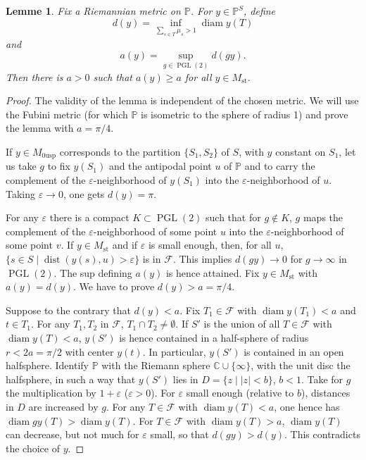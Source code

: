 \documentclass[12pt,a4paper]{article}
\theoremstyle{plain}
\newtheorem{lemma}[theorem]{Lemme}
\theoremstyle{definition}
\theoremstyle{remark}
\DeclareMathOperator{\diam}{diam}
\DeclareMathOperator{\PGL}{PGL}
\newcommand{\CC}{\mathbb{C}}
\newcommand{\PP}{\mathbb{P}}
\numberwithin{equation}{section}
\providecommand{\CC}{\mathbb{C}}
\providecommand{\PP}{\mathbb{P}}
\providecommand{\PGL}{\operatorname{PGL}}
\providecommand{\na}{a}
\providecommand{\dist}{\operatorname{dist}}
\begin{document}
\begin{lemma}\label{lem:4.4.1}
Fix a Riemannian metric on $\PP$. For $y \in \PP^S$, define
\[
d(y) = \inf_{\sum_{s \in T} \mu_s > 1} \diam y(T)
\]
and
\[
a(y) = \sup_{g \in \PGL(2)} d(gy).
\]
Then there is $a > 0$ such that $\na(y) \geq a$ for all $y \in M_{\mathrm{st}}$.
\end{lemma}

\begin{proof}
The validity of the lemma is independent of the chosen metric. We will use the Fubini metric (for which $\PP$ is isometric to the sphere of radius 1) and prove the lemma with $a = \pi/4$.

If $y \in M_{0\mathrm{usp}}$ corresponds to the partition $\{S_1, S_2\}$ of $S$, with $y$ constant on $S_1$, let us take $g$ to fix $y(S_1)$ and the antipodal point $u$ of $\PP$ and to carry the complement of the $\varepsilon$-neighborhood of $y(S_1)$ into the $\varepsilon$-neighborhood of $u$. Taking $\varepsilon \to 0$, one gets $d(y) = \pi$.

For any $\varepsilon$ there is a compact $K \subset \PGL(2)$ such that for $g \notin K$, $g$ maps the complement of the $\varepsilon$-neighborhood of some point $u$ into the $\varepsilon$-neighborhood of some point $v$. If $y \in M_{\mathrm{st}}$ and if $\varepsilon$ is small enough, then, for all $u$, $\{s \in S \mid \dist(y(s), u) > \varepsilon\}$ is in $\mathscr{F}$. This implies $d(gy) \to 0$ for $g \to \infty$ in $\PGL(2)$. The sup defining $\na(y)$ is hence attained. Fix $y \in M_{\mathrm{st}}$ with $\na(y) = d(y)$. We have to prove $d(y) > a = \pi/4$.

Suppose to the contrary that $d(y) < a$. Fix $T_1 \in \mathscr{F}$ with $\diam y(T_1) < a$ and $t \in T_1$. For any $T_1, T_2$ in $\mathscr{F}$, $T_1 \cap T_2 \neq \emptyset$. If $S'$ is the union of all $T \in \mathscr{F}$ with $\diam y(T) < a$, $y(S')$ is hence contained in a half-sphere of radius $r < 2a = \pi/2$ with center $y(t)$. In particular, $y(S')$ is contained in an open halfsphere. Identify $\PP$ with the Riemann sphere $\CC \cup \{\infty\}$, with the unit disc the halfsphere, in such a way that $y(S')$ lies in $D = \{z \mid |z| < b\}$, $b < 1$. Take for $g$ the multiplication by $1 + \varepsilon$ ($\varepsilon > 0$). For $\varepsilon$ small enough (relative to $b$), distances in $D$ are increased by $g$. For any $T \in \mathscr{F}$ with $\diam y(T) < a$, one hence has $\diam gy(T) > \diam y(T)$. For $T \in \mathscr{F}$ with $\diam y(T) > a$, $\diam y(T)$ can decrease, but not much for $\varepsilon$ small, so that $d(gy) > d(y)$. This contradicts the choice of $y$.
\end{proof}
\end{document}
